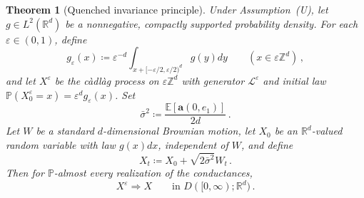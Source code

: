 \documentclass[11pt]{amsart}
\theoremstyle{plain}
\newtheorem{theorem}{Theorem}[section]
\theoremstyle{definition}
\theoremstyle{remark}
\newcommand{\E}{\mathbb{E}}
\newcommand{\Zd}{\mathbb{Z}^d}
\newcommand{\Rd}{\mathbb{R}^d}
\renewcommand{\a}{\mathbf{a}}
\newcommand{\eps}{\varepsilon}
\renewcommand{\P}{\mathbb{P}}
\begin{document}
	\begin{theorem}[Quenched invariance principle]
		\label{t.qip}
		Under Assumption~\textup{(U)}, let $g \in L^2(\Rd)$ be a nonnegative, compactly supported probability density.
		For each $\eps \in (0,1)$, define
		\begin{equation}
			\label{e.geps}
			g_\eps(x) \coloneqq \eps^{-d}\int_{x + [-\eps/2,\eps/2)^d} g(y) dy
			\qquad (x \in \eps\Zd)\,,
		\end{equation}
		and let $X^\eps$ be the c\`adl\`ag process on $\eps\Zd$ with generator $\mathcal{L}^\eps$ and initial law $\P(X_0^\eps = x) = \eps^d g_\eps(x)$.
		Set
		\begin{equation}
			\label{e.barsigma}
			\bar\sigma^2 \coloneqq \frac{\E[\a(0,e_1)]}{2d}\,.
		\end{equation}
		Let $W$ be a standard $d$-dimensional Brownian motion, let $X_0$ be an $\Rd$-valued random variable with law $g(x) dx$, independent of $W$, and define
		\[
		X_t \coloneqq X_0 + \sqrt{2\bar\sigma^2} W_t\,.
		\]
		Then for $\P$-almost every realization of the conductances,
		\[
		X^\eps \Rightarrow X
		\qquad\text{in } D([0,\infty); \Rd)\,.
		\]
	\end{theorem}
	
\end{document}
